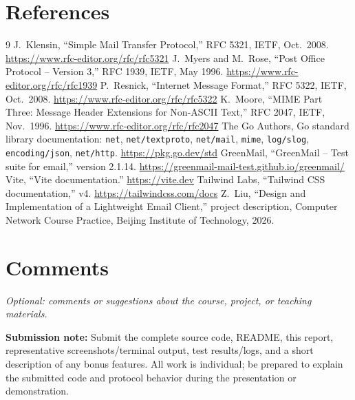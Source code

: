 \documentclass[11pt,a4paper]{article}
\newcommand{\prompt}[1]{\textit{#1}}
\begin{document}
\section{References}

\renewcommand{\refname}{}
\vspace{-2.5em}
\begin{thebibliography}{9}
 J.~Klensin, ``Simple Mail Transfer Protocol,'' RFC 5321, IETF, Oct.\ 2008. \url{https://www.rfc-editor.org/rfc/rfc5321}
 J.~Myers and M.~Rose, ``Post Office Protocol -- Version 3,'' RFC 1939, IETF, May 1996. \url{https://www.rfc-editor.org/rfc/rfc1939}
 P.~Resnick, ``Internet Message Format,'' RFC 5322, IETF, Oct.\ 2008. \url{https://www.rfc-editor.org/rfc/rfc5322}
 K.~Moore, ``MIME Part Three: Message Header Extensions for Non-ASCII Text,'' RFC 2047, IETF, Nov.\ 1996. \url{https://www.rfc-editor.org/rfc/rfc2047}
 The Go Authors, Go standard library documentation: \texttt{net}, \texttt{net/textproto}, \texttt{net/mail}, \texttt{mime}, \texttt{log/slog}, \texttt{encoding/json}, \texttt{net/http}. \url{https://pkg.go.dev/std}
 GreenMail, ``GreenMail -- Test suite for email,'' version 2.1.14. \url{https://greenmail-mail-test.github.io/greenmail/}
 Vite, ``Vite documentation.'' \url{https://vite.dev}
 Tailwind Labs, ``Tailwind CSS documentation,'' v4. \url{https://tailwindcss.com/docs}
 Z.~Liu, ``Design and Implementation of a Lightweight Email Client,'' project description, Computer Network Course Practice, Beijing Institute of Technology, 2026.
\end{thebibliography}

\section{Comments}

\prompt{Optional: comments or suggestions about the course, project, or teaching materials.}

\vfill

\noindent\textbf{Submission note:}
Submit the complete source code, README, this report, representative screenshots/terminal output, test results/logs, and a short description of any bonus features. All work is individual; be prepared to explain the submitted code and protocol behavior during the presentation or demonstration.
\end{document}

